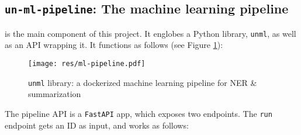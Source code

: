 
\subsection{\texttt{un-ml-pipeline}: The machine learning pipeline} \label{ssec:un-ml-pipeline-the-machine-learning-pipeline}

 is the main component of this project. It englobes a Python library, \texttt{unml}, as well as an API wrapping it. It functions as follows (see Figure \ref{fig:ml-pipeline}):


\begin{figure}[!htb]
    \centering

    \texttt{[image: res/ml-pipeline.pdf]}
    \caption{\texttt{unml} library: a dockerized machine learning pipeline for NER \& summarization}

    \label{fig:ml-pipeline}
\end{figure}

The pipeline API is a \texttt{FastAPI} app, which exposes two endpoints. The \texttt{run} endpoint gets an ID as input, and works as follows:

